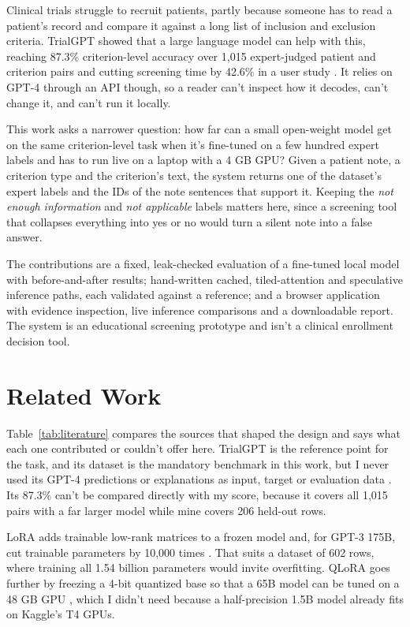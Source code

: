 \documentclass[conference]{IEEEtran}
\begin{document}
Clinical trials struggle to recruit patients, partly because someone has to read a patient's record and compare it against a long list of inclusion and exclusion criteria. TrialGPT showed that a large language model can help with this, reaching 87.3\% criterion-level accuracy over 1,015 expert-judged patient and criterion pairs and cutting screening time by 42.6\% in a user study \cite{jin2023trialgpt}. It relies on GPT-4 through an API though, so a reader can't inspect how it decodes, can't change it, and can't run it locally.

This work asks a narrower question: how far can a small open-weight model get on the same criterion-level task when it's fine-tuned on a few hundred expert labels and has to run live on a laptop with a 4 GB GPU? Given a patient note, a criterion type and the criterion's text, the system returns one of the dataset's expert labels and the IDs of the note sentences that support it. Keeping the \emph{not enough information} and \emph{not applicable} labels matters here, since a screening tool that collapses everything into yes or no would turn a silent note into a false answer.

The contributions are a fixed, leak-checked evaluation of a fine-tuned local model with before-and-after results; hand-written cached, tiled-attention and speculative inference paths, each validated against a reference; and a browser application with evidence inspection, live inference comparisons and a downloadable report. The system is an educational screening prototype and isn't a clinical enrollment decision tool.

\section{Related Work}

Table~\ref{tab:literature} compares the sources that shaped the design and says what each one contributed or couldn't offer here. TrialGPT is the reference point for the task, and its dataset is the mandatory benchmark in this work, but I never used its GPT-4 predictions or explanations as input, target or evaluation data \cite{jin2023trialgpt}. Its 87.3\% can't be compared directly with my score, because it covers all 1,015 pairs with a far larger model while mine covers 206 held-out rows.

LoRA adds trainable low-rank matrices to a frozen model and, for GPT-3 175B, cut trainable parameters by 10,000 times \cite{hu2022lora}. That suits a dataset of 602 rows, where training all 1.54 billion parameters would invite overfitting. QLoRA goes further by freezing a 4-bit quantized base so that a 65B model can be tuned on a 48 GB GPU \cite{dettmers2023qlora}, which I didn't need because a half-precision 1.5B model already fits on Kaggle's T4 GPUs.
\end{document}
